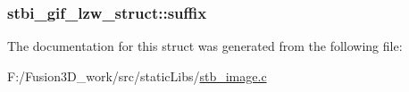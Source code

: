 \subsubsection[{suffix}]{ stbi\+\_\+gif\+\_\+lzw\+\_\+struct\+::suffix}\label{structstbi__gif__lzw__struct_a3ec7f462268018489345b79b2f123764}


The documentation for this struct was generated from the following file\+:\begin{DoxyCompactItemize}
\item 
F\+:/\+Fusion3\+D\+\_\+work/src/static\+Libs/\hyperlink{stb__image_8c}{stb\+\_\+image.\+c}\end{DoxyCompactItemize}
